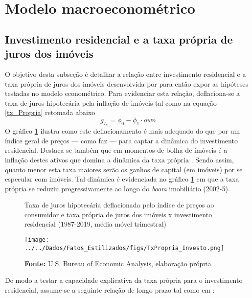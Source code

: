 \section{Modelo macroeconométrico}
\label{Modelo_empirico}

\subsection{Investimento residencial e a taxa própria de juros dos imóveis}
\label{SecTxPropria}

O objetivo desta subseção é detalhar a relação entre investimento residencial e a taxa própria de juros dos imóveis desenvolvida por \textcite{teixeira_crescimento_2015} para então expor as hipóteses testadas no modelo econométrico.
Para evidenciar esta relação, deflaciona-se a taxa de juros hipotecária pela inflação de imóveis tal como na equação \ref{tx_Propria} retomada abaixo
$$
g_{I_h} = \phi_0 - \phi_1\cdot own
$$
O gráfico \ref{gZ_Propria} ilustra como  este deflacionamento é mais adequado do que por um índice geral de preços ---  como faz \textcite[p.~143--146]{fair_macroeconometric_2013} --- para captar a dinâmica do investimento residencial.
Destaca-se também que em momentos de bolha de imóveis é a inflação destes ativos que domina a dinâmica da taxa própria \cite[p.~53]{teixeira_crescimento_2015}. Sendo assim, quanto menor esta taxa maiores serão os ganhos de capital (em imóveis) por se especular com imóveis.
Tal dinâmica é evidenciada no gráfico \ref{gZ_Propria} em que a taxa própria se reduziu progressivamente ao longo do \textit{boom} imobiliário (2002-5).




\begin{figure}[H]
	\centering
	\caption{Taxa de juros hipotecária deflacionada pelo índice de preços ao consumidor e taxa própria de juros dos imóveis x investimento residencial (1987-2019, média móvel trimestral)}
	\label{gZ_Propria}
	\texttt{[image: ../../Dados/Fatos\_Estilizados/figs/TxPropria\_Investo.png]}
	\caption*{\textbf{Fonte:} U.S. Bureau of Economic Analysis, elaboração própria}
\end{figure}

De modo a testar a capacidade explicativa da taxa própria para o investimento residencial, assume-se a seguinte relação de longo prazo tal como em \textcite{teixeira_crescimento_2015}:

